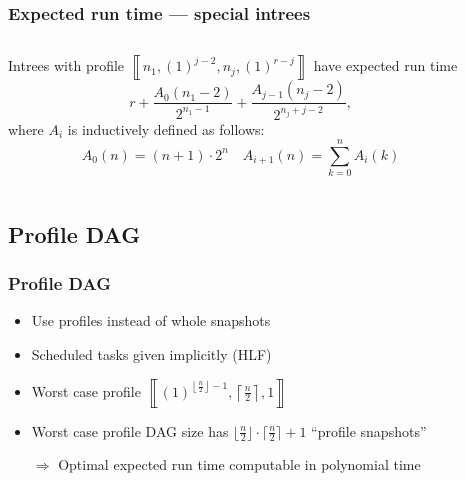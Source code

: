 \documentclass{beamer}
\newcommand{\profile}[1]{\left\llbracket #1 \right\rrbracket}
\newcommand{\profilerepeat}[2]{{(#1)}^{#2}}
\newcommand{\profileones}[1]{\profilerepeat{1}{#1}}
\begin{document}
\begin{frame}
  \frametitle{Expected run time --- special intrees}
  \begin{columns}
    \begin{column}{.7\textwidth}
      \begin{theorem}
        Intrees with profile $\profile{n_1,\profileones{j-2},n_j,\profileones{r-j}}$ have expected run time
        \begin{equation*}
          r + \frac{A_0(n_1-2)}{2^{n_1-1}} + \frac{A_{j-1}(n_j-2)}{2^{n_j+j-2}},
        \end{equation*}
        where $A_i$ is inductively defined as follows:
        \begin{equation*}
          A_0(n) = (n+1) \cdot 2^n \quad 
          A_{i+1}(n) = \sum_{k=0}^n A_{i}(k)
        \end{equation*}
      \end{theorem}
    \end{column}
    \begin{column}{.3\textwidth}
      
    \end{column}
  \end{columns}
\end{frame}

\subsection{Profile DAG}

\begin{frame}
  \frametitle{Profile DAG}
  \begin{itemize}
  \item Use profiles instead of whole snapshots
  \item Scheduled tasks given implicitly (HLF)
  \item Worst case profile $\profile{ \profileones{ \left\lfloor\frac{n}{2} \right\rfloor - 1}, \left\lceil \frac{n}{2} \right\rceil, 1 }$
  \item Worst case profile DAG size has $\lfloor \frac{n}{2} \rfloor \cdot \lceil \frac{n}{2} \rceil +1$ ``profile snapshots''

    $\Rightarrow$ Optimal expected run time computable in polynomial time 
    
    
  \end{itemize}
\end{frame}
\end{document}
